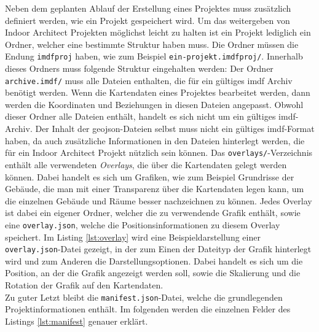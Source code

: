 Neben dem geplanten Ablauf der Erstellung eines Projektes muss zusätzlich definiert werden, wie ein Projekt gespeichert wird.
Um das weitergeben von Indoor Architect Projekten möglichst leicht zu halten ist ein Projekt lediglich ein Ordner, welcher eine bestimmte Struktur haben muss.
Die Ordner müssen die Endung \texttt{imdfproj} haben, wie zum Beispiel \texttt{ein-projekt.imdfproj/}.
Innerhalb dieses Ordners muss folgende Struktur eingehalten werden:
\vspace{5pt}
\vspace{5pt}
Der Ordner \texttt{archive.imdf/} muss alle Dateien enthalten, die für ein gültiges \acl{imdf} Archiv benötigt werden.
Wenn die Kartendaten eines Projektes bearbeitet werden, dann werden die Koordinaten und Beziehungen in diesen Dateien angepasst.
Obwohl dieser Ordner alle Dateien enthält, handelt es sich nicht um ein gültiges \ac{imdf}-Archiv.
Der Inhalt der \ac{geojson}-Dateien selbst muss nicht ein gültiges \ac{imdf}-Format haben, da auch zusätzliche Informationen in den Dateien hinterlegt werden, die für ein Indoor Architect Projekt nützlich sein können.\pbreak%
%
Das \texttt{overlays/}-Verzeichnis enthält alle verwendeten \emph{Overlays}, die über die Kartendaten gelegt werden können.
Dabei handelt es sich um Grafiken, wie zum Beispiel Grundrisse der Gebäude, die man mit einer Transparenz über die Kartendaten legen kann, um die einzelnen Gebäude und Räume besser nachzeichnen zu können.
Jedes Overlay ist dabei ein eigener Ordner, welcher die zu verwendende Grafik enthält, sowie eine \texttt{overlay.json}, welche die Positionsinformationen zu diesem Overlay speichert.
Im Listing \ref{lst:overlay} wird eine Beispieldarstellung einer \texttt{overlay.json}-Datei gezeigt, in der zum Einen der Dateityp der Grafik hinterlegt wird und zum Anderen die Darstellungsoptionen.
Dabei handelt es sich um die Position, an der die Grafik angezeigt werden soll, sowie die Skalierung und die Rotation der Grafik auf den Kartendaten.
\\
Zu guter Letzt bleibt die \texttt{manifest.json}-Datei, welche die grundlegenden Projektinformationen enthält.
Im folgenden werden die einzelnen Felder des Listings \ref{lst:manifest} genauer erklärt.
\\
